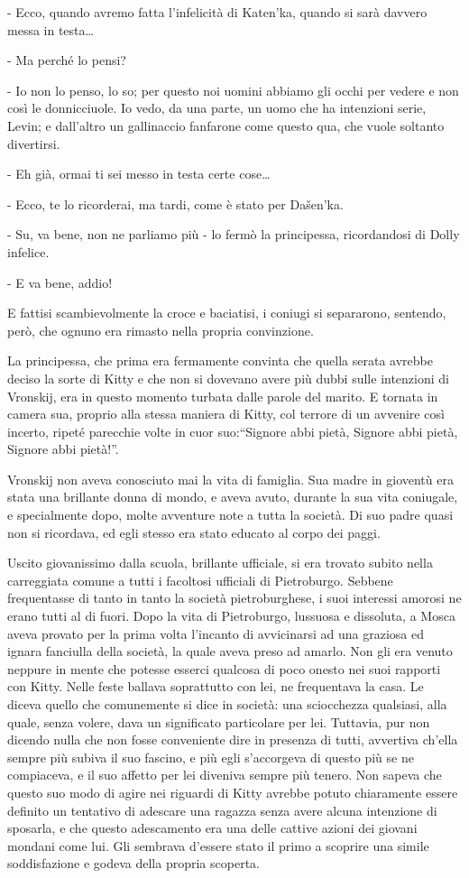 - Ecco, quando avremo fatta l'infelicità di Katen'ka, quando si sarà davvero messa in testa\ldots{} 

- Ma perché lo pensi? 

- Io non lo penso, lo so; per questo noi uomini abbiamo gli occhi per vedere e non così le donnicciuole. Io vedo, da una parte, un uomo che ha intenzioni serie, Levin; e dall'altro un gallinaccio fanfarone come questo qua, che vuole soltanto divertirsi. 

- Eh già, ormai ti sei messo in testa certe cose\ldots{} 

- Ecco, te lo ricorderai, ma tardi, come è stato per Dašen'ka. 

- Su, va bene, non ne parliamo più - lo fermò la principessa, ricordandosi di Dolly infelice. 

- E va bene, addio! 

E fattisi scambievolmente la croce e baciatisi, i coniugi si separarono, sentendo, però, che ognuno era rimasto nella propria convinzione. 

La principessa, che prima era fermamente convinta che quella serata avrebbe deciso la sorte di Kitty e che non si dovevano avere più dubbi sulle intenzioni di Vronskij, era in questo momento turbata dalle parole del marito. E tornata in camera sua, proprio alla stessa maniera di Kitty, col terrore di un avvenire così incerto, ripeté parecchie volte in cuor suo:``Signore abbi pietà, Signore abbi pietà, Signore abbi pietà!''. 

Vronskij non aveva conosciuto mai la vita di famiglia. Sua madre in gioventù era stata una brillante donna di mondo, e aveva avuto, durante la sua vita coniugale, e specialmente dopo, molte avventure note a tutta la società. Di suo padre quasi non si ricordava, ed egli stesso era stato educato al corpo dei paggi. 

Uscito giovanissimo dalla scuola, brillante ufficiale, si era trovato subito nella carreggiata comune a tutti i facoltosi ufficiali di Pietroburgo. Sebbene frequentasse di tanto in tanto la società pietroburghese, i suoi interessi amorosi ne erano tutti al di fuori. Dopo la vita di Pietroburgo, lussuosa e dissoluta, a Mosca aveva provato per la prima volta l'incanto di avvicinarsi ad una graziosa ed ignara fanciulla della società, la quale aveva preso ad amarlo. Non gli era venuto neppure in mente che potesse esserci qualcosa di poco onesto nei suoi rapporti con Kitty. Nelle feste ballava soprattutto con lei, ne frequentava la casa. Le diceva quello che comunemente si dice in società: una sciocchezza qualsiasi, alla quale, senza volere, dava un significato particolare per lei. Tuttavia, pur non dicendo nulla che non fosse conveniente dire in presenza di tutti, avvertiva ch'ella sempre più subiva il suo fascino, e più egli s'accorgeva di questo più se ne compiaceva, e il suo affetto per lei diveniva sempre più tenero. Non sapeva che questo suo modo di agire nei riguardi di Kitty avrebbe potuto chiaramente essere definito un tentativo di adescare una ragazza senza avere alcuna intenzione di sposarla, e che questo adescamento era una delle cattive azioni dei giovani mondani come lui. Gli sembrava d'essere stato il primo a scoprire una simile soddisfazione e godeva della propria scoperta. 

